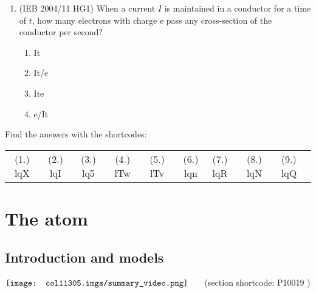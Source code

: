 \begin{enumerate}[noitemsep, label=\textbf{\arabic*}. ]
\begin{enumerate}[noitemsep, label=\textbf{\alph*}. ]
\begin{table}[H]
    \begin{caption}{\small\bfseries Table 16.4}\end{caption}
\end{table}
    \par
  \end{enumerate}
                  \label{m38776*uid104}\item (IEB 2004/11 HG1) When a current $I$ is maintained in a conductor for a time of $t$, how many electrons with charge e pass any cross-section of the conductor per second?
\label{m38776*id68784}\begin{enumerate}[noitemsep, label=\textbf{\alph*}. ] 
            \label{m38776*uid105}\item It
\label{m38776*uid106}\item It/e
\label{m38776*uid107}\item Ite
\label{m38776*uid108}\item e/It
\end{enumerate}
                  \end{enumerate}
  \label{m38776**end}
  \label{f13bac5321b85aca0e213ebdf4f72465**end}
\par {} Find the answers with the shortcodes:
 \par \begin{tabular}[h]{cccccc}
 (1.) lqX  &  (2.) lqI  &  (3.) lq5  &  (4.) lTw  &  (5.) lTv  &  (6.) lqn  &  (7.) lqR  &  (8.) lqN  &  (9.) lqQ  & \end{tabular}
         \chapter{The atom}
    \setcounter{figure}{1}
    \setcounter{subfigure}{1}
    \label{ea1c9e59656f96ee804546971cf6dee6}
         \section{ Introduction and models}
    \nopagebreak
            \label{m38756} $ \hspace{-5pt}\begin{array}{cccccccccccc}   \texttt{[image: col11305.imgs/summary\_video.png]} &   \end{array} $ \hspace{2 pt}\raisebox{-5 pt}{} {(section shortcode: P10019 )} \par 
    \label{m38756*cid1}
